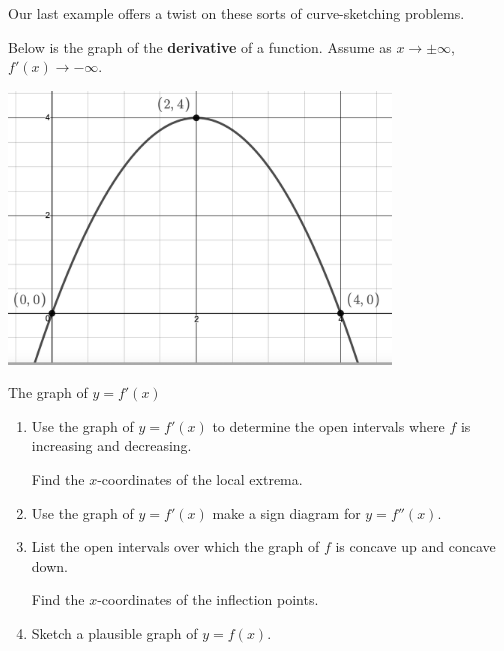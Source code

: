 \medskip

Our last example offers a twist on these sorts of curve-sketching problems.

\pagebreak

\begin{ex}\label{graphfromderivativegraphex} Below is the graph of the \textbf{derivative} of a function.  Assume as $x \rightarrow \pm \infty$, $f'(x) \rightarrow -\infty$.


\begin{center}

\includegraphics[width=4in]{./AppDerivativesGraphics/derivgraph.PNG}

The graph of $y=f'(x)$

\end{center}

\begin{enumerate}

\item  Use the graph of $y=f'(x)$ to determine the open intervals where $f$ is increasing and decreasing.  

\medskip

Find the $x$-coordinates of the local extrema.

\medskip

\item  Use the graph of $y=f'(x)$ make a sign diagram for $y=f''(x)$.

\medskip

\item  List the open intervals over which the graph of $f$ is concave up and concave down.  

\medskip

Find the $x$-coordinates of the inflection points. 

\medskip

\item  Sketch a plausible graph of $y = f(x)$.


\end{enumerate}
\end{ex}
